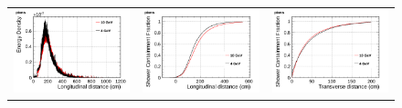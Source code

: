 \begin{figure}[htp]
\begin{tabular}{ccc}
    \includegraphics[scale=0.15]{figures/pions_density_overlay}&
    \includegraphics[scale=0.15]{figures/pions_lcont_overlay}&
    \includegraphics[scale=0.15]{figures/pions_wcont_overlay}\\
 

\end{tabular}
\end{figure}
